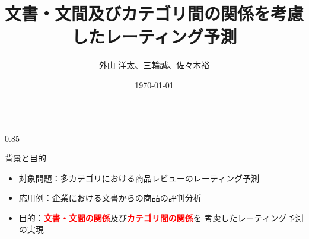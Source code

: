 \documentclass[unicode,10pt]{beamer}
\title{文書・文間及びカテゴリ間の関係を考慮したレーティング予測}
\institute{豊田工業大学 知能数理研究室}
\author{外山 洋太、三輪誠、佐々木裕}
\date{\today}
\newlength{\mycolumnwidth}
\newcommand{\fire}[1]{\textcolor{red}{\textbf{#1}}}
\begin{document}
\begin{frame}[t]
\vspace{-1em} %
\begin{columns}[onlytextwidth,t]

\begin{column}{0.85\mycolumnwidth}
  \begin{block}{背景と目的}
    \begin{itemize}
      \item 対象問題：多カテゴリにおける商品レビューのレーティング予測
      \item 応用例：企業における文書からの商品の評判分析
      \item 目的：\fire{文書・文間の関係}及び\fire{カテゴリ間の関係}を
                  考慮したレーティング予測の実現
    \end{itemize}
  \end{block}


\end{column}
\end{columns}
\end{frame}
\end{document}
